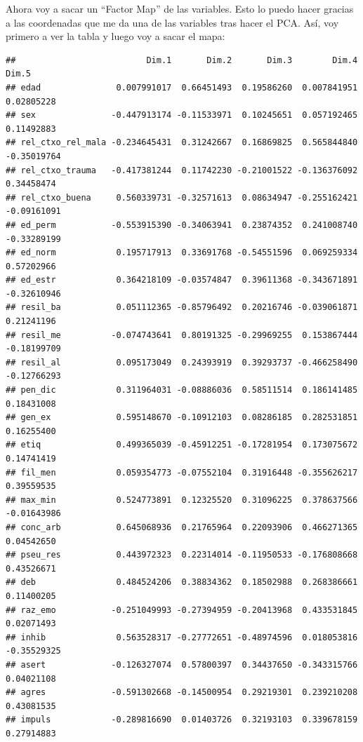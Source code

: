 \documentclass[]{article}
\newenvironment{Shaded}{\begin{snugshade}}{\end{snugshade}}
\newcommand{\OperatorTok}[1]{\textcolor[rgb]{0.81,0.36,0.00}{\textbf{#1}}}
\newcommand{\NormalTok}[1]{#1}
\begin{document}
Ahora voy a sacar un ``Factor Map'' de las variables. Esto lo puedo
hacer gracias a las coordenadas que me da una de las variables tras
hacer el PCA. Así, voy primero a ver la tabla y luego voy a sacar el
mapa:

\begin{Shaded}
\end{Shaded}

\begin{verbatim}
##                          Dim.1       Dim.2       Dim.3        Dim.4       Dim.5
## edad               0.007991017  0.66451493  0.19586260  0.007841951  0.02805228
## sex               -0.447913174 -0.11533971  0.10245651  0.057192465  0.11492883
## rel_ctxo_rel_mala -0.234645431  0.31242667  0.16869825  0.565844840 -0.35019764
## rel_ctxo_trauma   -0.417381244  0.11742230 -0.21001522 -0.136376092  0.34458474
## rel_ctxo_buena     0.560339731 -0.32571613  0.08634947 -0.255162421 -0.09161091
## ed_perm           -0.553915390 -0.34063941  0.23874352  0.241008740 -0.33289199
## ed_norm            0.195717913  0.33691768 -0.54551596  0.069259334  0.57202966
## ed_estr            0.364218109 -0.03574847  0.39611368 -0.343671891 -0.32610946
## resil_ba           0.051112365 -0.85796492  0.20216746 -0.039061871  0.21241196
## resil_me          -0.074743641  0.80191325 -0.29969255  0.153867444 -0.18199709
## resil_al           0.095173049  0.24393919  0.39293737 -0.466258490 -0.12766293
## pen_dic            0.311964031 -0.08886036  0.58511514  0.186141485  0.18431008
## gen_ex             0.595148670 -0.10912103  0.08286185  0.282531851  0.16255400
## etiq               0.499365039 -0.45912251 -0.17281954  0.173075672  0.14741419
## fil_men            0.059354773 -0.07552104  0.31916448 -0.355626217  0.39559535
## max_min            0.524773891  0.12325520  0.31096225  0.378637566 -0.01643986
## conc_arb           0.645068936  0.21765964  0.22093906  0.466271365  0.04542650
## pseu_res           0.443972323  0.22314014 -0.11950533 -0.176808668  0.43526671
## deb                0.484524206  0.38834362  0.18502988  0.268386661  0.11400205
## raz_emo           -0.251049993 -0.27394959 -0.20413968  0.433531845  0.02071493
## inhib              0.563528317 -0.27772651 -0.48974596  0.018053816 -0.35529325
## asert             -0.126327074  0.57800397  0.34437650 -0.343315766  0.04021108
## agres             -0.591302668 -0.14500954  0.29219301  0.239210208  0.43081535
## impuls            -0.289816690  0.01403726  0.32193103  0.339678159  0.27914883
\end{verbatim}
\end{document}
